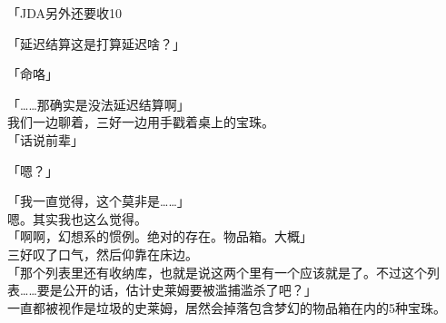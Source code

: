 「JDA另外还要收10%

「延迟结算这是打算延迟啥？」

「命咯」

「……那确实是没法延迟结算啊」\\

我们一边聊着，三好一边用手戳着桌上的宝珠。\\

「话说前辈」

「嗯？」

「我一直觉得，这个莫非是……」\\

嗯。其实我也这么觉得。\\

「啊啊，幻想系的惯例。绝对的存在。物品箱。大概」\\

三好叹了口气，然后仰靠在床边。\\

「那个列表里还有收纳库，也就是说这两个里有一个应该就是了。不过这个列表……要是公开的话，估计史莱姆要被滥捕滥杀了吧？」\\

一直都被视作是垃圾的史莱姆，居然会掉落包含梦幻的物品箱在内的5种宝珠。\\

